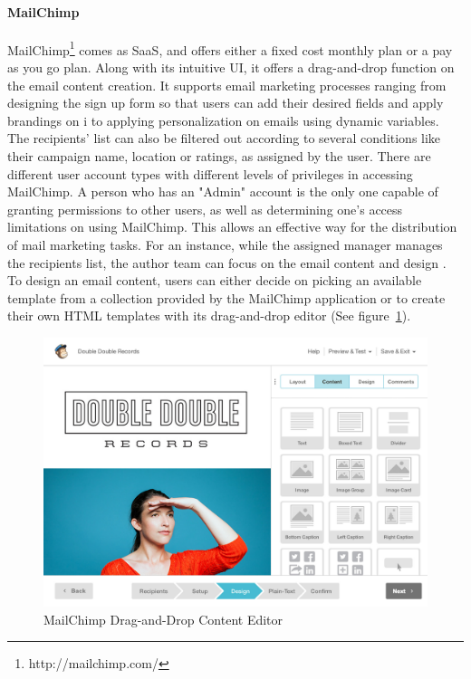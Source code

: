 \paragraph{MailChimp}
MailChimp\footnote{http://mailchimp.com/} comes as \ac{SaaS}, and offers either a fixed cost monthly plan or a pay as you go plan. Along with its intuitive \ac{UI}, it offers a drag-and-drop function on the email content creation. It supports email marketing processes ranging from designing the sign up form so that users can add their desired fields and apply brandings on i to applying personalization on emails using dynamic variables. The recipients' list can also be filtered out according to several conditions like their campaign name, location or ratings, as assigned by the user. There are different user account types with different levels of privileges in accessing MailChimp. A person who has an "Admin" account is the only one capable of granting permissions to other users, as well as determining one's access limitations on using MailChimp. This allows an effective way for the distribution of mail marketing tasks. For an instance, while the assigned manager manages the recipients list, the author team can focus on the email content and design \citep{TheRocketScienceGroupLLC2013}. To design an email content, users can either decide on picking an available template from a collection provided by the MailChimp application or to create their own \ac{HTML} templates with its drag-and-drop editor (See figure~\ref{fig:MailChimp-DragAndDropEditor}).
\vspace{1cm}

\begin{figure}[H]
	\centering
	\includegraphics[width=1.00\textwidth]{imgs/MailChimp-DragAndDropEditor.jpg}
	\caption[MailChimp Drag-and-Drop Content Editor]{MailChimp Drag-and-Drop Content Editor \citep{TheRocketScienceGroupLLC2013a}}
	\label{fig:MailChimp-DragAndDropEditor}
\end{figure}

